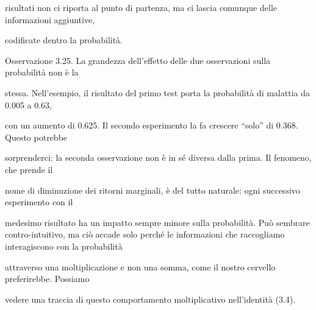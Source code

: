 \documentclass[a4paper,portrait,12pt]{article}
\begin{document}
\begin{flushleft}
risultati non ci riporta al punto di partenza, ma ci lascia comunque delle informazioni aggiuntive,
\end{flushleft}


\begin{flushleft}
codificate dentro la probabilit\`{a}.
\end{flushleft}


\begin{flushleft}
Osservazione 3.25. La grandezza dell'effetto delle due osservazioni sulla probabilit\`{a} non \`{e} la
\end{flushleft}


\begin{flushleft}
stessa. Nell'esempio, il risultato del primo test porta la probabilit\`{a} di malattia da 0.005 a 0.63,
\end{flushleft}


\begin{flushleft}
con un aumento di 0.625. Il secondo esperimento la fa crescere ``solo'' di 0.368. Questo potrebbe
\end{flushleft}


\begin{flushleft}
sorprenderci: la seconda osservazione non \`{e} in s\'{e} diversa dalla prima. Il fenomeno, che prende il
\end{flushleft}


\begin{flushleft}
nome di diminuzione dei ritorni marginali, \`{e} del tutto naturale: ogni successivo esperimento con il
\end{flushleft}


\begin{flushleft}
medesimo risultato ha un impatto sempre minore sulla probabilit\`{a}. Pu\`{o} sembrare contro-intuitivo, ma ci\`{o} accade solo perch\'{e} le informazioni che raccogliamo interagiscono con la probabilit\`{a}
\end{flushleft}


\begin{flushleft}
attraverso una moltiplicazione e non una somma, come il nostro cervello preferirebbe. Possiamo
\end{flushleft}


\begin{flushleft}
vedere una traccia di questo comportamento moltiplicativo nell'identit\`{a} (3.4).
\end{flushleft}
\end{document}
